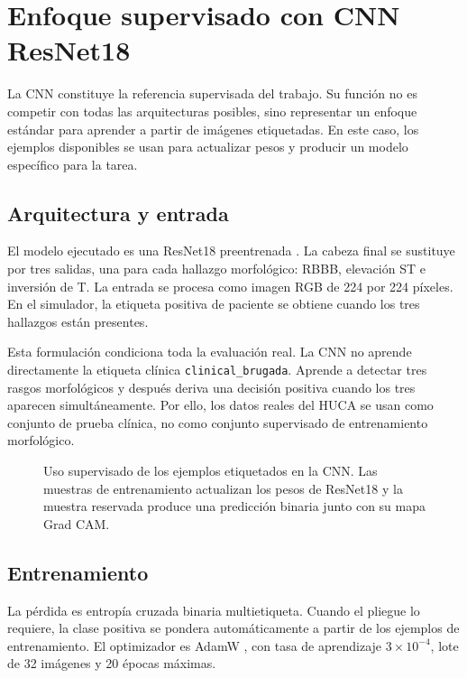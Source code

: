 \section{Enfoque supervisado con CNN ResNet18}
\label{chap:cnn_enfoque}

La CNN constituye la referencia supervisada del trabajo. Su función no es competir con todas las arquitecturas posibles, sino representar un enfoque estándar para aprender a partir de imágenes etiquetadas. En este caso, los ejemplos disponibles se usan para actualizar pesos y producir un modelo específico para la tarea.

\subsection{Arquitectura y entrada}

El modelo ejecutado es una ResNet18 preentrenada \cite{he2016}. La cabeza final se sustituye por tres salidas, una para cada hallazgo morfológico: RBBB, elevación ST e inversión de T. La entrada se procesa como imagen RGB de 224 por 224 píxeles. En el simulador, la etiqueta positiva de paciente se obtiene cuando los tres hallazgos están presentes.

Esta formulación condiciona toda la evaluación real. La CNN no aprende directamente la etiqueta clínica \texttt{clinical\_brugada}. Aprende a detectar tres rasgos morfológicos y después deriva una decisión positiva cuando los tres aparecen simultáneamente. Por ello, los datos reales del HUCA se usan como conjunto de prueba clínica, no como conjunto supervisado de entrenamiento morfológico.

\begin{figure}[H]
  \centering
  \caption{Uso supervisado de los ejemplos etiquetados en la CNN. Las muestras de entrenamiento actualizan los pesos de ResNet18 y la muestra reservada produce una predicción binaria junto con su mapa Grad CAM.}
  \label{fig:cnn_convolutional_pipeline}
\end{figure}

\subsection{Entrenamiento}

La pérdida es entropía cruzada binaria multietiqueta. Cuando el pliegue lo requiere, la clase positiva se pondera automáticamente a partir de los ejemplos de entrenamiento. El optimizador es AdamW \cite{loshchilov2019}, con tasa de aprendizaje \(3\times10^{-4}\), lote de 32 imágenes y 20 épocas máximas.

